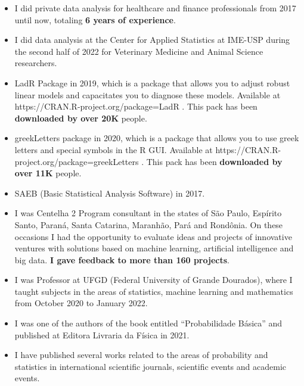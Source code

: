 \documentclass[10pt,a4paper]{altacv}
\begin{document}

\begin{itemize}
\item I did private data analysis for healthcare and finance professionals from 2017 until now, totaling \textbf{6 years of experience}.
\item I did data analysis at the Center for Applied Statistics at IME-USP during the second half of 2022 for Veterinary Medicine and Animal Science researchers.
\end{itemize}


\begin{itemize}
\item LadR Package in 2019, which is a package that allows you to adjust robust linear models and capacitates you to diagnose these models. Available at https://CRAN.R-project.org/package=LadR . This pack has been \textbf{downloaded by over 20K} people.
\item greekLetters package in 2020, which is a package that allows you to use greek letters and special symbols in the R GUI. Available at https://CRAN.R-project.org/package=greekLetters . This pack has been \textbf{downloaded by over 11K} people.
\item SAEB (Basic Statistical Analysis Software) in 2017.
\end{itemize}


\begin{itemize}
\item I was Centelha 2 Program consultant in the states of São Paulo, Espírito Santo, Paraná, Santa Catarina, Maranhão, Pará and Rondônia. On these occasions I had the opportunity to evaluate ideas and projects of innovative ventures with solutions based on machine learning, artificial intelligence and big data. \textbf{I gave feedback to more than 160 projects}.
\end{itemize}


\begin{itemize}
\item I was Professor at UFGD (Federal University of Grande Dourados), where I taught subjects in the areas of statistics, machine learning and mathematics from October 2020 to January 2022. 

\item I was one of the authors of the book entitled ``Probabilidade Básica'' and published at Editora Livraria da Física in 2021.

\item I have published several works related to the areas of probability and statistics in international scientific journals, scientific events and academic events. 

\end{itemize}
\end{document}
